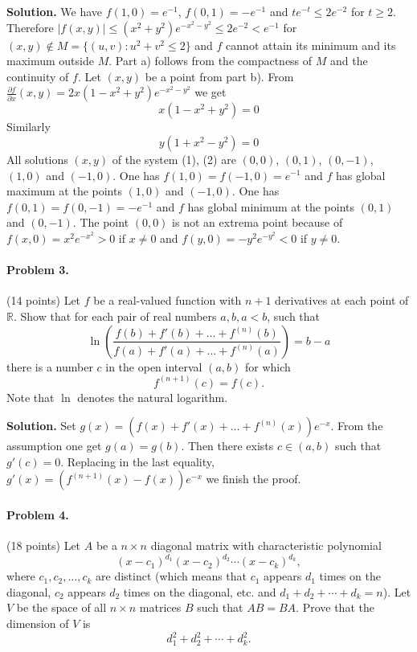 \documentclass{article}
\begin{document}
\textbf{Solution.} We have $f(1,0) = e^{-1}$, $f(0,1) = -e^{-1}$
and $te^{-t} \leq 2e^{-2}$ for $t \geq 2$.
Therefore $|f(x,y)| \leq (x^2 + y^2)e^{-x^2-y^2} \leq 2e^{-2} < e^{-1}$
for $(x,y) \not\in M = \{(u, v) : u^2 + v^2 \leq 2\}$ and $f$ cannot attain
its minimum and its maximum outside $M$.
Part a) follows from the compactness of $M$ and the continuity of $f$.
Let $(x,y)$ be a point from part b).
From $\frac{\partial f}{\partial x}(x, y) = 2x(1 - x^2 + y^2)e^{-x^2-y^2}$ we get
\begin{equation}
x(1 - x^2 + y^2) = 0 \tag{1}
\end{equation}
Similarly
\begin{equation}
y(1 + x^2 - y^2) = 0 \tag{2}
\end{equation}
All solutions $(x, y)$ of the system (1),
(2) are $(0,0)$, $(0,1)$, $(0,-1)$, $(1,0)$ and $(-1,0)$.
One has $f(1,0) = f(-1,0) = e^{-1}$ and $f$ has global maximum
at the points $(1,0)$ and $(-1,0)$.
One has $f(0,1) = f(0,-1) = -e^{-1}$ and $f$ has global minimum
at the points $(0,1)$ and $(0,-1)$. The point $(0,0)$ is not
an extrema point because of $f(x,0) = x^2 e^{-x^2} > 0$
if $x \neq 0$ and $f(y,0) = -y^2 e^{-y^2} < 0$ if $y \neq 0$.

\paragraph{Problem 3.} (14 points)
Let $f$ be a real-valued function with $n + 1$ derivatives
at each point of $\mathbb{R}$.
Show that for each pair of real numbers $a, b, a < b$, such that
\[
\ln \left( \frac{f(b) + f'(b) + \ldots + f^{(n)}(b)}{f(a) + f'(a) + \ldots + f^{(n)}(a)} \right) = b - a
\]
there is a number $c$ in the open interval $(a, b)$ for which
\[
f^{(n+1)}(c) = f(c).
\]
Note that $\ln$ denotes the natural logarithm.

\textbf{Solution.}
Set $g(x) = \left( f(x) + f'(x) + \ldots + f^{(n)}(x) \right) e^{-x}$.
From the assumption one get $g(a) = g(b)$.
Then there exists $c \in (a, b)$ such that $g'(c) = 0$.
Replacing in the last equality, $g'(x) = \left( f^{(n+1)}(x) - f(x) \right) e^{-x}$
we finish the proof.

\paragraph{Problem 4.} (18 points)
Let $A$ be a $n \times n$ diagonal matrix with characteristic polynomial
\[
(x - c_1)^{d_1}(x - c_2)^{d_2} \cdots (x - c_k)^{d_k},
\]
where $c_1, c_2, \ldots, c_k$ are distinct
(which means that $c_1$ appears $d_1$ times on the diagonal,
$c_2$ appears $d_2$ times on the diagonal, etc. and $d_1 + d_2 + \cdots + d_k = n$).
Let $V$ be the space of all $n \times n$ matrices $B$ such that $AB = BA$.
Prove that the dimension of $V$ is
\[
d_1^2 + d_2^2 + \cdots + d_k^2.
\]
\end{document}
